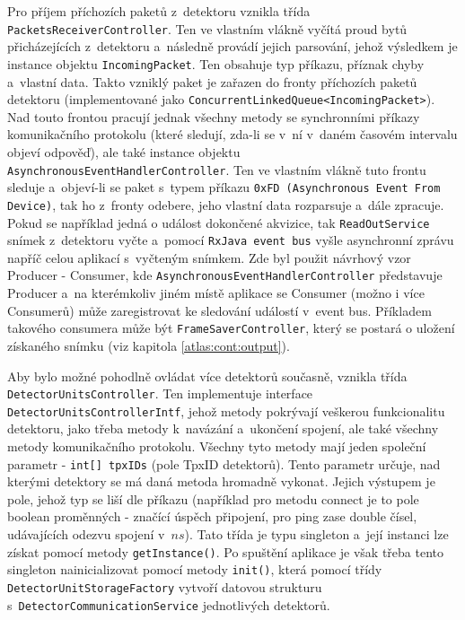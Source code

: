 Pro příjem příchozích paketů z~detektoru vznikla třída \texttt{PacketsReceiverController}. Ten ve vlastním vlákně vyčítá proud bytů přicházejících z~detektoru a~následně provádí jejich parsování, jehož výsledkem je instance objektu \texttt{IncomingPacket}. Ten obsahuje typ příkazu, příznak chyby a~vlastní data. Takto vzniklý paket je zařazen do fronty příchozích paketů detektoru (implementované jako \texttt{ConcurrentLinkedQueue<IncomingPacket>}). Nad touto frontou pracují jednak všechny metody se synchronními příkazy komunikačního protokolu (které sledují, zda-li se v~ní v~daném časovém intervalu objeví odpověď), ale také instance objektu \texttt{AsynchronousEventHandlerController}. Ten ve vlastním vlákně tuto frontu sleduje a~objeví-li se paket s~typem příkazu \texttt{0xFD (Asynchronous Event From Device)}, tak ho z~fronty odebere, jeho vlastní data rozparsuje a~dále zpracuje. Pokud se například jedná o událost dokončené akvizice, tak \texttt{ReadOutService} snímek z~detektoru vyčte a~pomocí \texttt{RxJava event bus} vyšle asynchronní zprávu napříč celou aplikací s~vyčteným snímkem. Zde byl použit návrhový vzor Producer - Consumer, kde \texttt{AsynchronousEventHandlerController} představuje Producer a~na kterémkoliv jiném místě aplikace se Consumer (možno i více Consumerů) může zaregistrovat ke sledování událostí v~event bus. Příkladem takového consumera může být \texttt{FrameSaverController}, který se postará o uložení získaného snímku (viz kapitola \ref{atlas:cont:output}).

Aby bylo možné pohodlně ovládat více detektorů současně, vznikla třída\\\texttt{DetectorUnitsController}. Ten implementuje interface \texttt{DetectorUnitsControllerIntf}, jehož metody pokrývají veškerou funkcionalitu detektoru, jako třeba metody k~navázání a~ukončení spojení, ale také všechny metody komunikačního protokolu. Všechny tyto metody mají jeden společní parametr - \texttt{int[] tpxIDs} (pole TpxID detektorů). Tento parametr určuje, nad kterými detektory se má daná metoda hromadně vykonat. Jejich výstupem je pole, jehož typ se liší dle příkazu (například pro metodu connect je to pole boolean proměnných - značící úspěch připojení, pro ping zase double čísel, udávajících odezvu spojení v~$ns$). Tato třída je typu singleton a~její instanci lze získat pomocí metody \texttt{getInstance()}. Po spuštění aplikace je však třeba tento singleton nainicializovat pomocí metody \texttt{init()}, která pomocí třídy \texttt{DetectorUnitStorageFactory} vytvoří datovou strukturu  s~\texttt{DetectorCommunicationService} jednotlivých detektorů.


